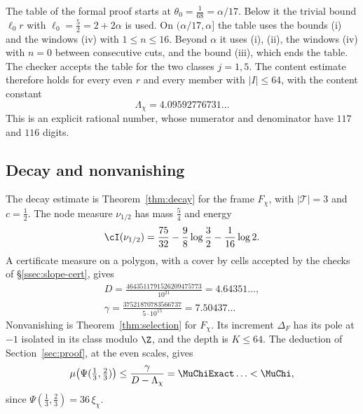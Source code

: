 The table of the formal proof starts at $\theta_0=\frac1{68}=\alpha/17$. Below it the trivial bound $\ell_0r$ with
$\ell_0=\frac52=2+2\alpha$ is used. On $(\alpha/17,\alpha]$ the table uses the bounds (i) and the windows (iv) with
$1\le n\le16$. Beyond $\alpha$ it uses (i), (ii), the windows (iv) with $n=0$ between consecutive cuts, and the bound
(iii), which ends the table. The checker accepts the table for the two classes $j=1,5$. The content estimate therefore
holds for every even $r$ and every member with $|I|\le64$, with the content constant
\[
 \Lambda_\chi=4.09592776731\ldots
\]
This is an explicit rational number, whose numerator and denominator have $117$ and $116$ digits.

\subsection{Decay and nonvanishing}
The decay estimate is Theorem~\ref{thm:decay} for the frame $F_\chi$, with $|\mathcal T|=3$ and $c=\frac12$. The node
measure $\nu_{1/2}$ has mass $\frac54$ and energy
\[
 \cI(\nu_{1/2})=\frac{75}{32}-\frac98\log\frac32-\frac1{16}\log2 .
\]
A certificate measure on a polygon, with a cover by cells accepted by the checks of \S\ref{ssec:slope-cert}, gives
\[
\begin{gathered}
 D=\frac{4643511791526209475773}{10^{21}}=4.64351\ldots,\\ \gamma=\frac{37521870783566737}{5\cdot10^{15}}=7.50437\ldots
\end{gathered}
\]
Nonvanishing is Theorem~\ref{thm:selection} for $F_\chi$. Its increment $\Delta_F$ has its pole at $-1$ isolated in its
class modulo $\Z$, and the depth is $K\le64$. The deduction of Section~\ref{sec:proof}, at the even scales, gives
\[
 \mu\bigl(\Psi(\tfrac13,\tfrac23)\bigr)\le\frac\gamma{D-\Lambda_\chi}=\MuChiExact\ldots<\MuChi,
\]
since $\Psi(\frac13,\frac23)=36\,\xi_\chi$.
